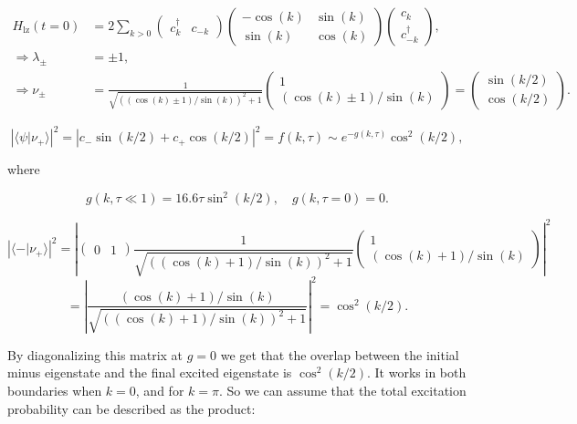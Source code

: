 \documentclass{article}
\begin{document}
\begin{align*}
    H_{\text{lz}}(t=0)      & = 2\sum_{k>0}
    \begin{pmatrix}
        c_k^\dagger & c_{-k}
    \end{pmatrix}
    \begin{pmatrix}
        -\cos(k) & \sin(k) \\
        \sin(k)  & \cos(k)
    \end{pmatrix}
    \begin{pmatrix}
        c_k \\
        c_{-k}^\dagger
    \end{pmatrix},                                                               \\
    \Rightarrow \lambda_\pm & = \pm 1,                                           \\
    \Rightarrow \nu_\pm     & = \frac{1}{\sqrt{((\cos(k) \pm 1)/\sin(k))^2 + 1}}
    \begin{pmatrix}
        1 \\
        (\cos(k) \pm 1)/\sin(k)
    \end{pmatrix}
    =
    \begin{pmatrix}
        \sin(k/2) \\
        \cos(k/2)
    \end{pmatrix}.
\end{align*}


\[
    \left| \langle \psi | \nu_+ \rangle \right|^2 = \left| c_- \sin(k/2) + c_+ \cos(k/2) \right|^2 = f(k, \tau) \sim e^{-g(k,\tau)} \cos^2(k/2),
\]

where

\[
    g(k, \tau \ll 1) = 16.6\tau \sin^2(k/2), \quad g(k, \tau = 0) = 0.
\]

\[
    \left| \langle - | \nu_+ \rangle \right|^2 = \left|
    \begin{pmatrix}
        0 & 1
    \end{pmatrix}
    \frac{1}{\sqrt{((\cos(k) + 1)/\sin(k))^2 + 1}}
    \begin{pmatrix}
        1 \\
        (\cos(k) + 1)/\sin(k)
    \end{pmatrix}
    \right|^2
\]
\[
    = \left| \frac{(\cos(k) + 1)/\sin(k)}{\sqrt{((\cos(k) + 1)/\sin(k))^2 + 1}} \right|^2 = \cos^2(k/2).
\]

By diagonalizing this matrix at \( g = 0 \) we get that the overlap between the initial minus eigenstate and the final excited eigenstate is \( \cos^2(k/2) \). It works in both boundaries when \( k = 0 \), and for \( k = \pi \). So we can assume that the total excitation probability can be described as the product:
\end{document}
